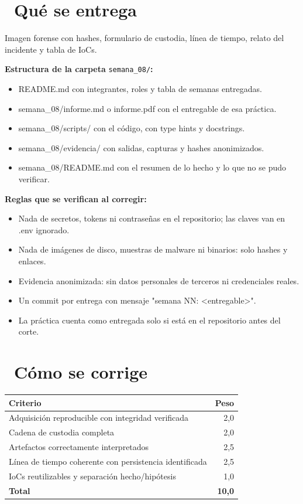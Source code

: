 \documentclass[11pt,a4paper]{article}
\newcommand{\iconotexto}[2]{\textcolor{cyanNeon}{\faIcon{#1}}~#2}
\begin{document}
\section{\iconotexto{box-open}{Qué se entrega}}

Imagen forense con hashes, formulario de custodia, línea de tiempo, relato del incidente y tabla de IoCs.

\textbf{Estructura de la carpeta} \texttt{semana\_08/}\textbf{:}

\begin{itemize}[leftmargin=1.4em,itemsep=2pt,topsep=3pt]
  \item README.md con integrantes, roles y tabla de semanas entregadas.
  \item semana\_08/informe.md o informe.pdf con el entregable de esa práctica.
  \item semana\_08/scripts/ con el código, con type hints y docstrings.
  \item semana\_08/evidencia/ con salidas, capturas y hashes anonimizados.
  \item semana\_08/README.md con el resumen de lo hecho y lo que no se pudo verificar.
\end{itemize}

\textbf{Reglas que se verifican al corregir:}

\begin{itemize}[leftmargin=1.4em,itemsep=2pt,topsep=3pt]
  \item Nada de secretos, tokens ni contraseñas en el repositorio; las claves van en .env ignorado.
  \item Nada de imágenes de disco, muestras de malware ni binarios: solo hashes y enlaces.
  \item Evidencia anonimizada: sin datos personales de terceros ni credenciales reales.
  \item Un commit por entrega con mensaje "semana NN: \textless{}entregable\textgreater{}".
  \item La práctica cuenta como entregada solo si está en el repositorio antes del corte.
\end{itemize}

\section{\iconotexto{ruler-combined}{Cómo se corrige}}

\begin{tabularx}{\linewidth}{@{}X r@{}}
\toprule
Criterio & Peso\\
\midrule
Adquisición reproducible con integridad verificada & 2,0 \\
Cadena de custodia completa & 2,0 \\
Artefactos correctamente interpretados & 2,5 \\
Línea de tiempo coherente con persistencia identificada & 2,5 \\
IoCs reutilizables y separación hecho/hipótesis & 1,0 \\
\midrule
\textbf{Total} & \textbf{10,0}\\
\bottomrule
\end{tabularx}
\end{document}
